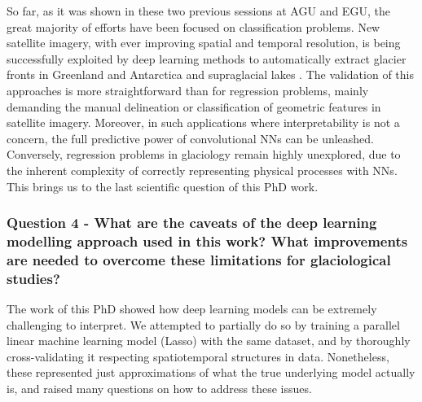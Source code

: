 So far, as it was shown in these two previous sessions at AGU and EGU, the great majority of efforts have been focused on classification problems. New satellite imagery, with ever improving spatial and temporal resolution, is being successfully exploited by deep learning methods to automatically extract glacier fronts in Greenland and Antarctica \citep[e.g.][]{lea_google_2018,baumhoer_automated_2019,mohajerani_detection_2019, zhang_automatically_2019} and supraglacial lakes \cite[e.g.][]{yuan_automatic_2020}. The validation of this approaches is more straightforward than for regression problems, mainly demanding the manual delineation or classification of geometric features in satellite imagery. Moreover, in such applications where interpretability is not a concern, the full predictive power of convolutional NNs can be unleashed. Conversely, regression problems in glaciology remain highly unexplored, due to the inherent complexity of correctly representing physical processes with NNs. This brings us to the last scientific question of this PhD work.

\subsubsection{Question 4 - What are the caveats of the deep learning modelling approach used in this work? What improvements are needed to overcome these limitations for glaciological studies?}

The work of this PhD showed how deep learning models can be extremely challenging to interpret. We attempted to partially do so by training a parallel linear machine learning model (Lasso) with the same dataset, and by thoroughly cross-validating it respecting spatiotemporal structures in data. Nonetheless, these represented just approximations of what the true underlying model actually is, and raised many questions on how to address these issues. 

